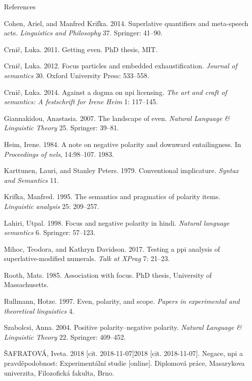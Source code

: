 \documentclass[ignorenonframetext,]{beamer}
\begin{document}
\begin{frame}[allowframebreaks]{References}

\scriptsize

\hypertarget{refs}{}
\hypertarget{ref-cohen2014superlative}{}
Cohen, Ariel, and Manfred Krifka. 2014. Superlative quantifiers and
meta-speech acts. \emph{Linguistics and Philosophy} 37. Springer:
41--90.

\hypertarget{ref-crnic2011getting}{}
Crnič, Luka. 2011. Getting even. PhD thesis, MIT.

\hypertarget{ref-crnivc2012focus}{}
Crnič, Luka. 2012. Focus particles and embedded exhaustification.
\emph{Journal of semantics} 30. Oxford University Press: 533--558.

\hypertarget{ref-crnivc2014against}{}
Crnič, Luka. 2014. Against a dogma on npi licensing. \emph{The art and
craft of semantics: A festschrift for Irene Heim} 1: 117--145.

\hypertarget{ref-giannakidou2007landscape}{}
Giannakidou, Anastasia. 2007. The landscape of even. \emph{Natural
Language \& Linguistic Theory} 25. Springer: 39--81.

\hypertarget{ref-heim1984note}{}
Heim, Irene. 1984. A note on negative polarity and downward
entailingness. In \emph{Proceedings of nels}, 14:98--107. 1983.

\hypertarget{ref-KarttunenPeters:1979}{}
Karttunen, Lauri, and Stanley Peters. 1979. Conventional implicature.
\emph{Syntax and Semantics} 11.

\hypertarget{ref-krifka1995semantics}{}
Krifka, Manfred. 1995. The semantics and pragmatics of polarity items.
\emph{Linguistic analysis} 25: 209--257.

\hypertarget{ref-lahiri1998focus}{}
Lahiri, Utpal. 1998. Focus and negative polarity in hindi. \emph{Natural
language semantics} 6. Springer: 57--123.

\hypertarget{ref-mihoc2017testing}{}
Mihoc, Teodora, and Kathryn Davidson. 2017. Testing a ppi analysis of
superlative-modified numerals. \emph{Talk at XPrag} 7: 21--23.

\hypertarget{ref-Rooth:1985}{}
Rooth, Mats. 1985. Association with focus. PhD thesis, University of
Massachusetts.

\hypertarget{ref-rullmann1997even}{}
Rullmann, Hotze. 1997. Even, polarity, and scope. \emph{Papers in
experimental and theoretical linguistics} 4.

\hypertarget{ref-szabolcsi2004positive}{}
Szabolcsi, Anna. 2004. Positive polarity--negative polarity.
\emph{Natural Language \& Linguistic Theory} 22. Springer: 409--452.

\hypertarget{ref-safratova2018thesis}{}
ŠAFRATOVÁ, Iveta. 2018 {[}cit. 2018-11-07{]}2018 {[}cit. 2018-11-07{]}.
Negace, npi a pravděpodobnost: Experimentální studie {[}online{]}.
Diplomová práce, Masarykova univerzita, Filozofická fakulta, Brno.

\end{frame}
\end{document}
